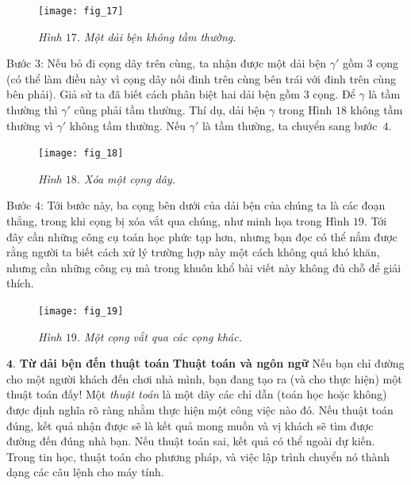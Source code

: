 \begin{multicols}{2}
\begin{figure}[H]
		\centering
		\captionsetup{labelformat= empty, justification=centering}
		\texttt{[image: fig\_17]}
		\caption{\small\textit{\color{duongvaotoanhoc}Hình $17$. Một dải bện không tầm thường.}}
		\vspace*{-10pt}
	\end{figure}
	Bước $3$: Nếu bỏ đi cọng dây trên cùng, ta nhận được một dải bện $\gamma'$ gồm $3$ cọng (có thể làm điều này vì cọng dây nối đinh trên cùng bên trái với đinh trên cùng bên phải). Giả sử ta đã biết cách phân biệt hai dải bện gồm $3$ cọng. Để $\gamma$ là tầm thường thì $\gamma'$ cũng phải tầm thường. Thí dụ, dải bện $\gamma$ trong Hình $18$ không tầm thường vì $\gamma'$ không tầm thường. Nếu $\gamma'$ là tầm thường, ta chuyển sang bước~$4$.
	\begin{figure}[H]
		\vspace*{-5pt}
		\centering
		\captionsetup{labelformat= empty, justification=centering}
		\texttt{[image: fig\_18]}
		\caption{\small\textit{\color{duongvaotoanhoc}Hình $18$. Xóa một cọng dây.}}
		\vspace*{-10pt}
	\end{figure}
	Bước $4$: Tới bước này, ba cọng bên dưới của dải bện của chúng ta là các đoạn thẳng, trong khi cọng bị xóa vắt qua chúng, như minh họa trong Hình $19$. Tới đây cần những công cụ toán học phức tạp hơn, nhưng bạn đọc có thể nắm được rằng người ta biết cách xử lý trường hợp này một cách không quá khó khăn, nhưng cần những công cụ mà trong khuôn khổ bài viết này không đủ chỗ để giải thích.
	\begin{figure}[H]
		\vspace*{-5pt}
		\centering
		\captionsetup{labelformat= empty, justification=centering}
		\texttt{[image: fig\_19]}
		\caption{\small\textit{\color{duongvaotoanhoc}Hình $19$. Một cọng vắt qua các cọng khác.}}
		\vspace*{-10pt}
	\end{figure}
	$\pmb{4.}$ \textbf{\color{duongvaotoanhoc}Từ dải bện đến thuật toán}
	\vskip 0.1cm
	\textbf{\color{duongvaotoanhoc}Thuật toán và ngôn ngữ}
	\vskip 0.1cm
	Nếu bạn chỉ đường cho một người khách đến chơi nhà mình, bạn đang tạo ra (và cho thực hiện) một thuật toán đấy! Một \textit{thuật toán} là một dãy các chỉ dẫn (toán học hoặc không) được định nghĩa rõ ràng nhằm thực hiện một công việc nào đó. Nếu thuật toán đúng, kết quả nhận được sẽ là kết quả mong muốn và vị khách sẽ tìm được đường đến đúng nhà bạn. Nếu thuật toán sai, kết quả có thể ngoài dự kiến. Trong tin học, thuật toán cho phương pháp, và việc lập trình chuyển nó thành dạng các câu lệnh cho máy tính.

\end{multicols}
